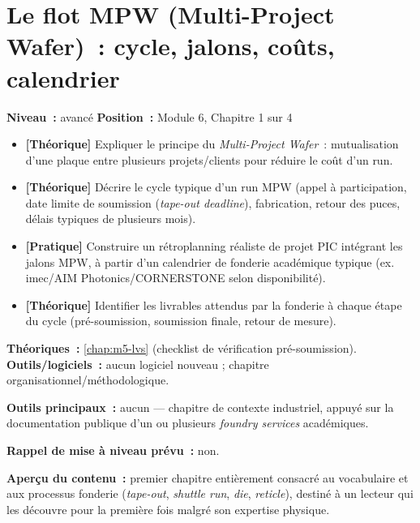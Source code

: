 
\chapter{Le flot MPW (Multi-Project Wafer)~: cycle, jalons, coûts, calendrier}
\label{chap:m6-mpw}

\noindent\textbf{Niveau~:} avancé \hfill \textbf{Position~:} Module 6, Chapitre 1 sur 4

\begin{objectifs}
\begin{itemize}[leftmargin=1.4em]
  \item \textbf{[Théorique]} Expliquer le principe du \emph{Multi-Project Wafer}~: mutualisation d'une plaque entre plusieurs projets/clients pour réduire le coût d'un run.
  \item \textbf{[Théorique]} Décrire le cycle typique d'un run MPW (appel à participation, date limite de soumission (\emph{tape-out deadline}), fabrication, retour des puces, délais typiques de plusieurs mois).
  \item \textbf{[Pratique]} Construire un rétroplanning réaliste de projet PIC intégrant les jalons MPW, à partir d'un calendrier de fonderie académique typique (ex. imec/AIM Photonics/CORNERSTONE selon disponibilité).
  \item \textbf{[Théorique]} Identifier les livrables attendus par la fonderie à chaque étape du cycle (pré-soumission, soumission finale, retour de mesure).
\end{itemize}
\end{objectifs}

\begin{prerequis}
\textbf{Théoriques~:} \cref{chap:m5-lvs} (checklist de vérification pré-soumission).\\
\textbf{Outils/logiciels~:} aucun logiciel nouveau ; chapitre organisationnel/méthodologique.
\end{prerequis}

\noindent\textbf{Outils principaux~:} aucun — chapitre de contexte industriel, appuyé sur la documentation publique d'un ou plusieurs \emph{foundry services} académiques.

\noindent\textbf{Rappel de mise à niveau prévu~:} non.

\noindent\textbf{Aperçu du contenu~:} premier chapitre entièrement consacré au vocabulaire et aux processus fonderie (\emph{tape-out}, \emph{shuttle run}, \emph{die}, \emph{reticle}), destiné à un lecteur qui les découvre pour la première fois malgré son expertise physique.

